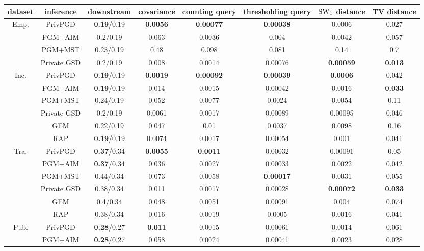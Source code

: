 \begin{table}[ht]
\footnotesize
\centering
\begin{tabular}{cccccccc}
\toprule
dataset & inference & downstream & covariance & counting query & thresholding query & $\text{SW}_1$ distance & TV distance \\

\midrule \multirow{4}{*}{Emp. } & PrivPGD&\textbf{0.19}/0.19 & \textbf{0.0056} & \textbf{0.00077} & \textbf{0.00038} & 0.0006 & 0.027 \\
 & PGM+AIM&0.2/0.19 & 0.063 & 0.0036 & 0.004 & 0.0042 & 0.057 \\
 & PGM+MST&0.23/0.19 & 0.48 & 0.098 & 0.081 & 0.14 & 0.7 \\
 & Private GSD&0.2/0.19 & 0.008 & 0.0014 & 0.00076 & \textbf{0.00059} & \textbf{0.013} \\
\midrule \multirow{6}{*}{Inc. } & PrivPGD&\textbf{0.19}/0.19 & \textbf{0.0019} & \textbf{0.00092} & \textbf{0.00039} & \textbf{0.0006} & 0.042 \\
 & PGM+AIM&\textbf{0.19}/0.19 & 0.014 & 0.0015 & 0.00042 & 0.0016 & \textbf{0.033} \\
 & PGM+MST&0.24/0.19 & 0.052 & 0.0077 & 0.0024 & 0.0054 & 0.11 \\
 & Private GSD&0.2/0.19 & 0.0061 & 0.0017 & 0.00089 & 0.00095 & 0.046 \\
 & GEM&0.22/0.19 & 0.047 & 0.01 & 0.0037 & 0.0098 & 0.16 \\
 & RAP&\textbf{0.19}/0.19 & 0.0074 & 0.0017 & 0.00054 & 0.001 & 0.041 \\
\midrule \multirow{6}{*}{Tra. } & PrivPGD&\textbf{0.37}/0.34 & \textbf{0.0055} & \textbf{0.0011} & 0.00032 & 0.00091 & 0.05 \\
 & PGM+AIM&\textbf{0.37}/0.34 & 0.036 & 0.0027 & 0.00033 & 0.0022 & 0.042 \\
 & PGM+MST&0.44/0.34 & 0.073 & 0.0058 & \textbf{0.00017} & 0.0031 & 0.055 \\
 & Private GSD&0.38/0.34 & 0.011 & 0.0017 & 0.00028 & \textbf{0.00072} & \textbf{0.033} \\
 & GEM&0.4/0.34 & 0.048 & 0.0051 & 0.00091 & 0.004 & 0.074 \\
 & RAP&0.38/0.34 & 0.016 & 0.0019 & 0.0005 & 0.0016 & 0.041 \\
\midrule \multirow{6}{*}{Pub. } & PrivPGD&\textbf{0.28}/0.27 & \textbf{0.011} & 0.0015 & 0.00061 & 0.0014 & 0.061 \\
 & PGM+AIM&\textbf{0.28}/0.27 & 0.058 & 0.0024 & 0.00041 & 0.0023 & 0.028 \\

\end{tabular}
\end{table}
